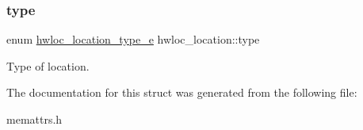 \mbox{\label{a00314_aeb9c0ab74a7d3506a76d0b82600a28a7}} 
\subsubsection{\texorpdfstring{type}{type}}
{\footnotesize\ttfamily enum \hyperlink{a00211_ga33099ba58f607fc70925da3777688586}{hwloc\+\_\+location\+\_\+type\+\_\+e} hwloc\+\_\+location\+::type}



Type of location. 



The documentation for this struct was generated from the following file\+:\begin{DoxyCompactItemize}
\item 
memattrs.\+h\end{DoxyCompactItemize}
